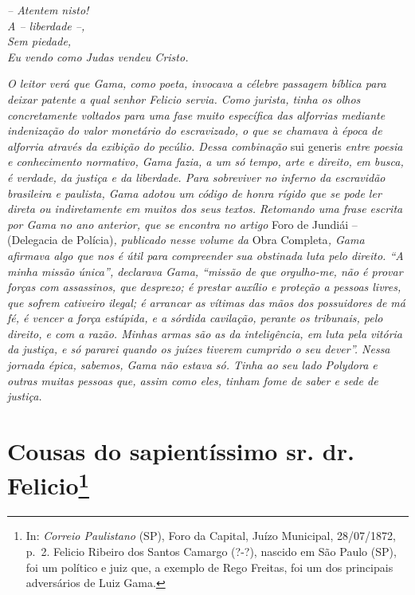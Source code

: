 {\emph{-- Atentem nisto!\\
A -- liberdade --,\\
Sem piedade,\\
Eu vendo como Judas vendeu Cristo.}

\emph{O leitor verá que Gama, como poeta, invocava a célebre passagem
bíblica para deixar patente a qual senhor Felicio servia. Como jurista,
tinha os olhos concretamente voltados para uma fase muito específica das
alforrias mediante indenização do valor monetário do escravizado, o que
se chamava à época de alforria através da exibição do pecúlio. Dessa
combinação} sui generis \emph{entre poesia e conhecimento normativo,
Gama fazia, a um só tempo, arte e direito, em busca, é verdade, da
justiça e da liberdade. Para sobreviver no inferno da escravidão
brasileira e paulista, Gama adotou um código de honra rígido que se pode
ler direta ou indiretamente em muitos dos seus textos. Retomando uma
frase escrita por Gama no ano anterior, que se encontra no artigo} Foro
de Jundiái -- (Delegacia de Polícia)\emph{, publicado nesse volume da}
Obra Completa\emph{, Gama afirmava algo que nos é útil para compreender
sua obstinada luta pelo direito. ``A minha missão única'', declarava Gama,
``missão de que orgulho-me, não é provar forças com assassinos, que
desprezo; é prestar auxílio e proteção a pessoas livres, que sofrem
cativeiro ilegal; é arrancar as vítimas das mãos dos possuidores de má
fé, é vencer a força estúpida, e a sórdida cavilação, perante os
tribunais, pelo direito, e com a razão. Minhas armas são as da
inteligência, em luta pela vitória da justiça, e só pararei quando os
juízes tiverem cumprido o seu dever''. Nessa jornada épica, sabemos, Gama
não estava só. Tinha ao seu lado Polydora e outras muitas pessoas que,
assim como eles, tinham fome de saber e sede de justiça.}

\chapter{Cousas do sapientíssimo sr. dr. Felicio\footnote{ In: 
\emph{Correio Paulistano} (SP), Foro da Capital, Juízo
  Municipal, 28/07/1872, p.~2. Felicio Ribeiro dos Santos Camargo (?-?),
  nascido em São Paulo (SP), foi um político e juiz que, a exemplo de
  Rego Freitas, foi um dos principais adversários de Luiz Gama.}} %

}
